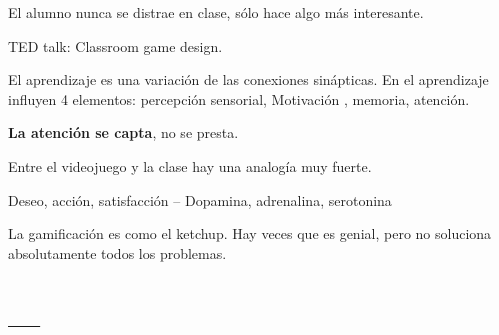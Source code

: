 \documentclass[palatino]{apuntes}
\begin{document}
El alumno nunca se distrae en clase, sólo hace algo más interesante.

TED talk: Classroom game design.

El aprendizaje es una variación de las conexiones sinápticas.
En el aprendizaje influyen 4 elementos: percepción sensorial, Motivación , memoria, atención. 

\textbf{La atención se capta}, no se presta.


Entre el videojuego y la clase hay una analogía muy fuerte. 

\begin{defn}[DAS]
Deseo, acción, satisfacción -- Dopamina, adrenalina, serotonina
\end{defn}


La gamificación es como el ketchup. Hay veces que es genial, pero no soluciona absolutamente todos los problemas.



\appendix

\chapter{---}


\printindex
\end{document}
